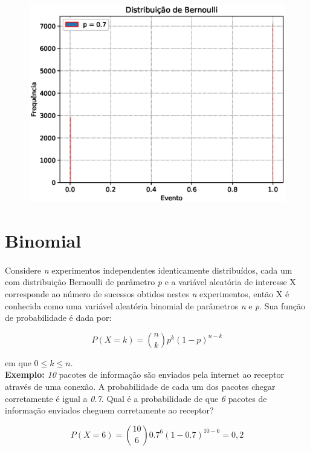 \documentclass[a4paper,12pt]{article}
\begin{document}
\begin{figure}[h!]
  \begin{center}
    \includegraphics[scale=0.41]{bernoulli07.eps}
  \end{center}
\end{figure}

\section{Binomial}

\paragraph{} Considere {\it n} experimentos independentes
identicamente distribuídos, cada um com distribuição Bernoulli de
parâmetro {\it p} e a variável aleatória de interesse X corresponde ao número de
sucessos obtidos nestes {\it n} experimentos, então X é conhecida como
uma variável aleatória binomial de parâmetros {\it n} e {\it p}. Sua
função de probabilidade é dada por:

$$ P(X = k) = \binom{n}{k} p^k (1-p)^{n-k}$$

em que $ 0 \le k \le n $. \\

{\bf Exemplo:} {\it 10} pacotes de informação são enviados pela
internet ao receptor através de uma conexão. A probabilidade de cada
um dos pacotes chegar corretamente é igual a {\it 0.7}. Qual é a
probabilidade de que {\it 6} pacotes de informação enviados cheguem
corretamente ao receptor?

$$ P(X = 6) = \binom{10}{6} 0.7^6 (1-0.7)^{10-6} = 0,2$$
\end{document}
